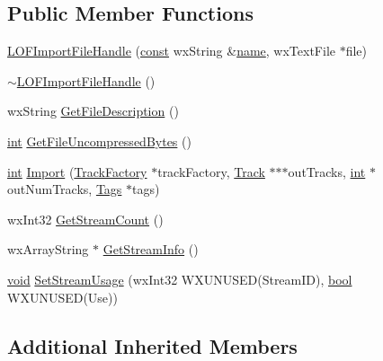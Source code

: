 \subsection*{Public Member Functions}
\begin{DoxyCompactItemize}
\item 
\hyperlink{class_l_o_f_import_file_handle_a9c612911df30c2295dd899536dedb279}{L\+O\+F\+Import\+File\+Handle} (\hyperlink{getopt1_8c_a2c212835823e3c54a8ab6d95c652660e}{const} wx\+String \&\hyperlink{lib_2expat_8h_a1b49b495b59f9e73205b69ad1a2965b0}{name}, wx\+Text\+File $\ast$file)
\item 
\hyperlink{class_l_o_f_import_file_handle_a1b5d3be515828d8dadd3312a46b33f3a}{$\sim$\+L\+O\+F\+Import\+File\+Handle} ()
\item 
wx\+String \hyperlink{class_l_o_f_import_file_handle_aed079b0e4d7feddacbec1dcfe12fcdec}{Get\+File\+Description} ()
\item 
\hyperlink{xmltok_8h_a5a0d4a5641ce434f1d23533f2b2e6653}{int} \hyperlink{class_l_o_f_import_file_handle_a516c53563ce679b5d941f8f04d44c01d}{Get\+File\+Uncompressed\+Bytes} ()
\item 
\hyperlink{xmltok_8h_a5a0d4a5641ce434f1d23533f2b2e6653}{int} \hyperlink{class_l_o_f_import_file_handle_a49fa4013b00112033e5367cffdc083da}{Import} (\hyperlink{class_track_factory}{Track\+Factory} $\ast$track\+Factory, \hyperlink{class_track}{Track} $\ast$$\ast$$\ast$out\+Tracks, \hyperlink{xmltok_8h_a5a0d4a5641ce434f1d23533f2b2e6653}{int} $\ast$out\+Num\+Tracks, \hyperlink{class_tags}{Tags} $\ast$tags)
\item 
wx\+Int32 \hyperlink{class_l_o_f_import_file_handle_a808f304c0465e11f1638bf54ce7aeb28}{Get\+Stream\+Count} ()
\item 
wx\+Array\+String $\ast$ \hyperlink{class_l_o_f_import_file_handle_ab691f881bb9f62bae4f4523f3503f86b}{Get\+Stream\+Info} ()
\item 
\hyperlink{sound_8c_ae35f5844602719cf66324f4de2a658b3}{void} \hyperlink{class_l_o_f_import_file_handle_aa44aa98b63f06d620d9ea4dabb5ff460}{Set\+Stream\+Usage} (wx\+Int32 W\+X\+U\+N\+U\+S\+ED(Stream\+ID), \hyperlink{mac_2config_2i386_2lib-src_2libsoxr_2soxr-config_8h_abb452686968e48b67397da5f97445f5b}{bool} W\+X\+U\+N\+U\+S\+ED(Use))
\end{DoxyCompactItemize}
\subsection*{Additional Inherited Members}


